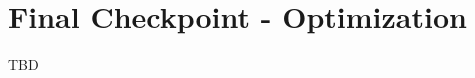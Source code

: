 \documentclass[11pt]{article}
\begin{document}
\newpage
\section{Final Checkpoint - Optimization}
TBD

%
%
%
%
%
%
%
%
\end{document}
